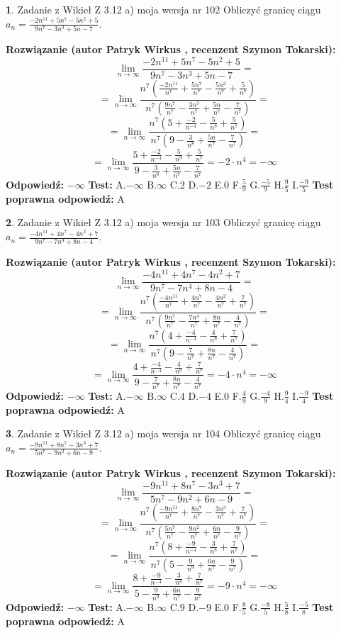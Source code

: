 \documentclass[12pt, a4paper]{article}
\theoremstyle{definition} %
\newtheorem{zad}{}
\newcommand{\zadStart}[1]{\begin{zad}#1\newline}
\newcommand{\zadStop}{\end{zad}}
\newcommand{\rozwStart}[2]{\noindent \textbf{Rozwiązanie (autor #1 , recenzent #2): }\newline}
\newcommand{\rozwStop}{\newline}
\newcommand{\odpStart}{\noindent \textbf{Odpowiedź:}\newline}
\newcommand{\odpStop}{\newline}
\newcommand{\testStart}{\noindent \textbf{Test:}\newline}
\newcommand{\testStop}{\newline}
\newcommand{\kluczStart}{\noindent \textbf{Test poprawna odpowiedź:}\newline}
\newcommand{\kluczStop}{\newline}
\begin{document}
\zadStart{Zadanie z Wikieł Z 3.12 a) moja wersja nr 102}
Obliczyć granicę ciągu $a_{n}=\frac{-2n^{11}+5n^{7}-5n^{2}+5}{9n^{7}-3n^{3}+5n-7}$.
\zadStop
\rozwStart{Patryk Wirkus}{Szymon Tokarski}
$$\lim\limits_{n\to\infty}\frac{-2n^{11}+5n^{7}-5n^{2}+5}{9n^{7}-3n^{3}+5n-7}=$$
$$=\lim\limits_{n\to\infty}\frac{n^{7}\left(\frac{-2n^{11}}{n^{7}}+\frac{5n^{7}}{n^{7}}-\frac{5n^{2}}{n^{7}}+\frac{5}{n^{7}}\right)}{n^{7}\left(\frac{9n^{7}}{n^{7}}-\frac{3n^{3}}{n^{7}}+\frac{5n}{n^{7}}-\frac{7}{n^{7}}\right)}=$$
$$=\lim\limits_{n\to\infty}\frac{n^{7}\left(5+\frac{-2}{n^{-4}}-\frac{5}{n^{9}}+\frac{5}{n^{7}}\right)}
{n^{7}\left(9-\frac{3}{n^{8}}+\frac{5n}{n^{7}}-\frac{7}{n^{7}}\right)}=$$
$$=\lim\limits_{n\to\infty}\frac{5+\frac{-2}{n^{-4}}-\frac{5}{n^{9}}+\frac{5}{n^{7}}}{9-\frac{3}{n^{8}}+\frac{5n}{n^{7}}-\frac{7}{n^{7}}}=-2\cdot n^{4} = -\infty$$
\rozwStop
\odpStart
$-\infty$
\odpStop
\testStart
A.$-\infty$
B.$\infty$
C.$2$
D.$-2$
E.$0$
F.$\frac{5}{9}$
G.$\frac{-5}{9}$
H.$\frac{9}{5}$
I.$\frac{-9}{5}$
\testStop
\kluczStart
A
\kluczStop



\zadStart{Zadanie z Wikieł Z 3.12 a) moja wersja nr 103}
Obliczyć granicę ciągu $a_{n}=\frac{-4n^{11}+4n^{7}-4n^{2}+7}{9n^{7}-7n^{4}+8n-4}$.
\zadStop
\rozwStart{Patryk Wirkus}{Szymon Tokarski}
$$\lim\limits_{n\to\infty}\frac{-4n^{11}+4n^{7}-4n^{2}+7}{9n^{7}-7n^{4}+8n-4}=$$
$$=\lim\limits_{n\to\infty}\frac{n^{7}\left(\frac{-4n^{11}}{n^{7}}+\frac{4n^{7}}{n^{7}}-\frac{4n^{2}}{n^{7}}+\frac{7}{n^{7}}\right)}{n^{7}\left(\frac{9n^{7}}{n^{7}}-\frac{7n^{4}}{n^{7}}+\frac{8n}{n^{7}}-\frac{4}{n^{7}}\right)}=$$
$$=\lim\limits_{n\to\infty}\frac{n^{7}\left(4+\frac{-4}{n^{-4}}-\frac{4}{n^{9}}+\frac{7}{n^{7}}\right)}
{n^{7}\left(9-\frac{7}{n^{7}}+\frac{8n}{n^{7}}-\frac{4}{n^{7}}\right)}=$$
$$=\lim\limits_{n\to\infty}\frac{4+\frac{-4}{n^{-4}}-\frac{4}{n^{9}}+\frac{7}{n^{7}}}{9-\frac{7}{n^{7}}+\frac{8n}{n^{7}}-\frac{4}{n^{7}}}=-4\cdot n^{4} = -\infty$$
\rozwStop
\odpStart
$-\infty$
\odpStop
\testStart
A.$-\infty$
B.$\infty$
C.$4$
D.$-4$
E.$0$
F.$\frac{4}{9}$
G.$\frac{-4}{9}$
H.$\frac{9}{4}$
I.$\frac{-9}{4}$
\testStop
\kluczStart
A
\kluczStop



\zadStart{Zadanie z Wikieł Z 3.12 a) moja wersja nr 104}
Obliczyć granicę ciągu $a_{n}=\frac{-9n^{11}+8n^{7}-3n^{3}+7}{5n^{7}-9n^{2}+6n-9}$.
\zadStop
\rozwStart{Patryk Wirkus}{Szymon Tokarski}
$$\lim\limits_{n\to\infty}\frac{-9n^{11}+8n^{7}-3n^{3}+7}{5n^{7}-9n^{2}+6n-9}=$$
$$=\lim\limits_{n\to\infty}\frac{n^{7}\left(\frac{-9n^{11}}{n^{7}}+\frac{8n^{7}}{n^{7}}-\frac{3n^{3}}{n^{7}}+\frac{7}{n^{7}}\right)}{n^{7}\left(\frac{5n^{7}}{n^{7}}-\frac{9n^{2}}{n^{7}}+\frac{6n}{n^{7}}-\frac{9}{n^{7}}\right)}=$$
$$=\lim\limits_{n\to\infty}\frac{n^{7}\left(8+\frac{-9}{n^{-4}}-\frac{3}{n^{8}}+\frac{7}{n^{7}}\right)}
{n^{7}\left(5-\frac{9}{n^{9}}+\frac{6n}{n^{7}}-\frac{9}{n^{7}}\right)}=$$
$$=\lim\limits_{n\to\infty}\frac{8+\frac{-9}{n^{-4}}-\frac{3}{n^{8}}+\frac{7}{n^{7}}}{5-\frac{9}{n^{9}}+\frac{6n}{n^{7}}-\frac{9}{n^{7}}}=-9\cdot n^{4} = -\infty$$
\rozwStop
\odpStart
$-\infty$
\odpStop
\testStart
A.$-\infty$
B.$\infty$
C.$9$
D.$-9$
E.$0$
F.$\frac{8}{5}$
G.$\frac{-8}{5}$
H.$\frac{5}{8}$
I.$\frac{-5}{8}$
\testStop
\kluczStart
A
\kluczStop
\end{document}
